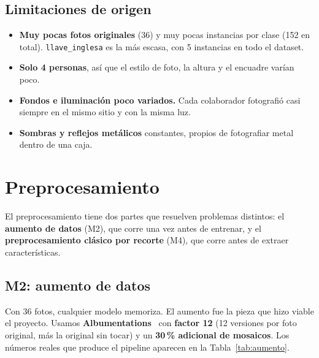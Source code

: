 \documentclass[11pt,a4paper]{article}
\newcommand{\clase}[1]{\texttt{#1}}
\begin{document}
\subsection{Limitaciones de origen}

\begin{itemize}
  \item \textbf{Muy pocas fotos originales} (36) y muy pocas instancias por clase (152 en total).
        \clase{llave\_inglesa} es la más escasa, con 5 instancias en todo el dataset.
  \item \textbf{Solo 4 personas}, así que el estilo de foto, la altura y el encuadre varían poco.
  \item \textbf{Fondos e iluminación poco variados.} Cada colaborador fotografió casi siempre en
        el mismo sitio y con la misma luz.
  \item \textbf{Sombras y reflejos metálicos} constantes, propios de fotografiar metal dentro de
        una caja.
\end{itemize}

\section{Preprocesamiento}
\label{sec:preproc}

El preprocesamiento tiene dos partes que resuelven problemas distintos: el \textbf{aumento de
datos} (M2), que corre una vez antes de entrenar, y el \textbf{preprocesamiento clásico por
recorte} (M4), que corre antes de extraer características.

\subsection{M2: aumento de datos}

Con 36 fotos, cualquier modelo memoriza. El aumento fue la pieza que hizo viable el proyecto.
Usamos \textbf{Albumentations}~\cite{albumentations} con \textbf{factor 12} (12 versiones por foto
original, más la original sin tocar) y un \textbf{30\,\% adicional de mosaicos}. Los números reales
que produce el pipeline aparecen en la Tabla~\ref{tab:aumento}.
\end{document}
